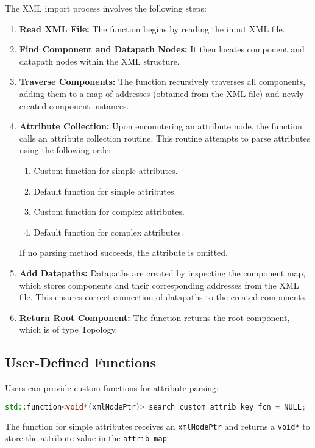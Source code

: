 The XML import process involves the following steps:

\begin{enumerate}
    \item \textbf{Read XML File:} The function begins by reading the input XML file.
    \item \textbf{Find Component and Datapath Nodes:} It then locates component and datapath nodes within the XML structure.
    \item \textbf{Traverse Components:} The function recursively traverses all components, adding them to a map of addresses (obtained from the XML file) and newly created component instances.
    \item \textbf{Attribute Collection:} Upon encountering an attribute node, the function calls an attribute collection routine. This routine attempts to parse attributes using the following order:
        \begin{enumerate}
            \item Custom function for simple attributes.
            \item Default function for simple attributes.
            \item Custom function for complex attributes.
            \item Default function for complex attributes.
        \end{enumerate}
        If no parsing method succeeds, the attribute is omitted.
    \item \textbf{Add Datapaths:} Datapaths are created by inspecting the component map, which stores components and their corresponding addresses from the XML file. This ensures correct connection of datapaths to the created components.
    \item \textbf{Return Root Component:} The function returns the root component, which is of type Topology.
\end{enumerate}

\subsection{User-Defined Functions}

Users can provide custom functions for attribute parsing:

    \begin{lstlisting}[language=C++, xleftmargin=4em, frame = single]
    std::function<void*(xmlNodePtr)> search_custom_attrib_key_fcn = NULL;
    \end{lstlisting}
    The function for simple attributes receives an \verb|xmlNodePtr| and returns a \verb|void*| to store the attribute value in the \verb|attrib_map|.

